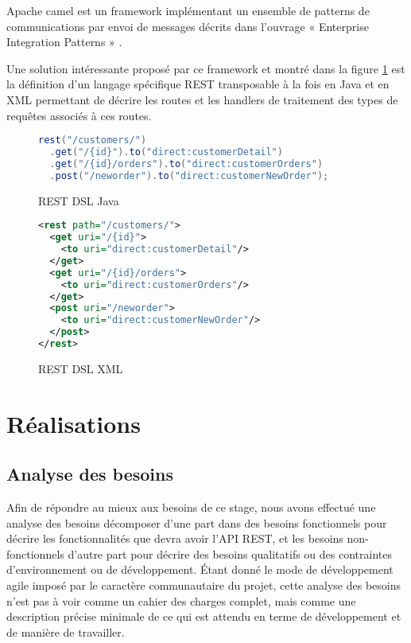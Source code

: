 \documentclass[a4paper, 11pt]{report}
\begin{document}
Apache camel est un framework implémentant un ensemble de patterns de
communications par envoi de messages décrits dans l'ouvrage «
Enterprise Integration Patterns » \cite{hohpe2003enterprise}.

Une solution intéressante proposé par ce framework et montré dans la
figure \ref{fig:restdsl} est la définition d'un langage spécifique REST
transposable à la fois en Java et en XML permettant de décrire les
routes et les handlers de traitement des types de requêtes associés à
ces routes.

\begin{figure}
  \ContinuedFloat*
  \begin{lstlisting}[language=java]
rest("/customers/")
  .get("/{id}").to("direct:customerDetail")
  .get("/{id}/orders").to("direct:customerOrders")
  .post("/neworder").to("direct:customerNewOrder");
  \end{lstlisting}
  \caption{REST DSL Java}
\end{figure}

\begin{figure}
  \ContinuedFloat
  \begin{lstlisting}[language=xml]
<rest path="/customers/">
  <get uri="/{id}">
    <to uri="direct:customerDetail"/>
  </get>
  <get uri="/{id}/orders">
    <to uri="direct:customerOrders"/>
  </get>
  <post uri="/neworder">
    <to uri="direct:customerNewOrder"/>
  </post>
</rest>
  \end{lstlisting}
  \caption{REST DSL XML}
  \label{fig:restdsl}
\end{figure}

\chapter{Réalisations}

\section{Analyse des besoins}

Afin de répondre au mieux aux besoins de ce stage, nous avons effectué
une analyse des besoins décomposer d'une part dans des besoins
fonctionnels pour décrire les fonctionnalités que devra avoir l'API
REST, et les besoins non-fonctionnels d'autre part pour décrire des
besoins qualitatifs ou des contraintes d'environnement ou de
développement.  Étant donné le mode de développement agile imposé par
le caractère communautaire du projet, cette analyse des besoins n'est
pas à voir comme un cahier des charges complet, mais comme une
description précise minimale de ce qui est attendu en terme de
développement et de manière de travailler.
\end{document}
